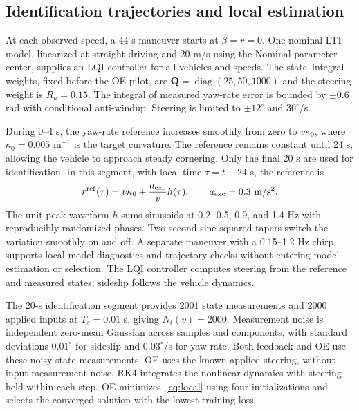 \documentclass[conference]{IEEEtran}
\newcommand{\rev}[1]{\textcolor{revisiongreen}{#1}}
\newcommand{\revred}[1]{\textcolor{revisionred}{#1}}
\newcommand{\focusrev}[1]{\textcolor{focusedrevision}{#1}}
\newcommand{\bs}[1]{\boldsymbol{#1}}
\begin{document}
\subsection{\rev{Identification trajectories} and local \rev{estimation}}
\label{sec:calibration}
\rev{At each} observed speed, a 44-s maneuver \rev{starts} at $\beta=r=0$.
\rev{One nominal} LTI model, linearized at straight driving and 20 m/s \rev{using
the Nominal parameter center}, supplies \rev{an} LQI \rev{controller} for all vehicles
and speeds. The \rev{state--integral} weights\focusrev{, fixed before the OE pilot, are}
$\bs{Q}=\operatorname{diag}(25,50,1000)$ and \rev{the} steering \rev{weight is}
$R_u=0.15$. \rev{The integral of} measured yaw-rate error is \rev{bounded by}
$\pm0.6$ rad with conditional anti-windup. \rev{Steering} is limited to
$\pm12^\circ$ and $30^\circ$/s.

\rev{During 0--4 s, the} yaw-rate reference \rev{increases smoothly from zero} to
$v\kappa_0$, \rev{where} $\kappa_0=0.005$ m$^{-1}$ \rev{is the target curvature.
The reference remains constant until 24 s, allowing the vehicle to approach
steady cornering. Only the final} 20 s \rev{are used} for \rev{identification.
In this segment, with local time $\tau=t-24$ s, the reference} is
\begingroup\color{revisiongreen}
\begin{equation}
 r^{\rm ref}(\tau)=v\kappa_0+\frac{a_{\rm exc}}{v}h(\tau),
 \qquad a_{\rm exc}=0.3~\mathrm{m/s^2}.
 \label{eq:acquisition-reference}
\end{equation}
\endgroup
The unit-peak waveform $h$ sums sinusoids at 0.2, 0.5, 0.9, and 1.4 Hz
with \rev{reproducibly randomized} phases. \rev{Two-second} sine-squared tapers \rev{switch
the variation smoothly on and off.} \revred{A separate maneuver with a 0.15--1.2 Hz
chirp supports local-model diagnostics and trajectory checks without entering
model estimation or selection}.
\rev{The LQI controller computes steering
from the reference} and \rev{measured states; sideslip follows} the \rev{vehicle dynamics}.

\revred{The 20-s identification segment provides} 2001 state \rev{measurements}
and 2000 applied inputs \revred{at $T_s=0.01$ s, giving $N_i(v)=2000$}.
Measurement noise is independent zero-mean Gaussian across samples and
components, with standard deviations $0.01^\circ$ for \rev{sideslip} and
$0.03^\circ$/s for \rev{yaw rate. Both feedback and OE use} these noisy \rev{state
measurements}. OE uses the known applied steering, without input measurement
noise. \rev{RK4} integrates the \rev{nonlinear dynamics} with steering held within each step.
OE \rev{minimizes~\eqref{eq:local} using four initializations} and \rev{selects} the
converged solution with the lowest training loss.
\end{document}
